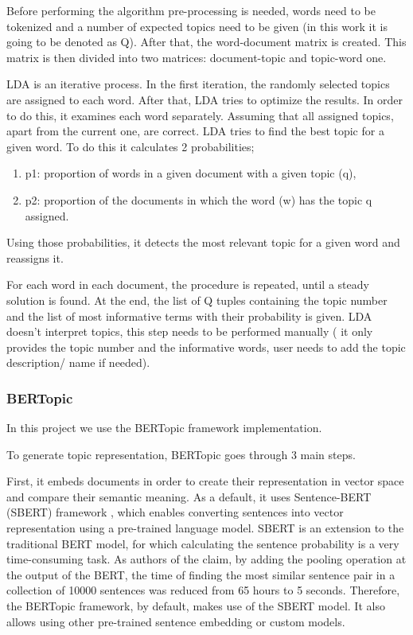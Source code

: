 \documentclass[11pt]{article}
\begin{document}
Before performing the algorithm pre-processing is needed, words need to be tokenized and a number of expected topics need to be given (in this work it is going to be denoted as Q). After that, the word-document matrix is created. This matrix is then divided into two matrices: document-topic and topic-word one. 

LDA is an iterative process. In the first iteration, the randomly selected topics are assigned to each word. After that, LDA tries to optimize the results. In order to do this, it examines each word separately. Assuming that all assigned topics, apart from the current one, are correct. LDA tries to find the best topic for a given word. To do this it calculates 2 probabilities;
\begin{enumerate}
\item p1: proportion of words in a given document with a given topic (q),
\item p2: proportion of the documents in which the word (w) has the topic q assigned.
\end{enumerate}
Using those probabilities, it detects the most relevant topic for a given word and reassigns it.

For each word in each document, the procedure is repeated, until a steady solution is found. At the  end, the list of Q tuples containing the topic number and the list of most informative terms with their probability is given. LDA doesn't interpret topics, this step needs to be performed manually ( it only provides the topic number and the informative words, user needs to add the topic description/ name if needed). 

\subsubsection{BERTopic}
In this project we use the \cite{pypi_bertopic} BERTopic framework implementation.

To generate topic representation, BERTopic goes through 3 main steps. 

First, it embeds documents in order to create their representation in vector space and compare their semantic meaning. As a default, it uses Sentence-BERT (SBERT) framework \cite{reimers-2019-sentence-bert}, which enables converting sentences into vector representation using a pre-trained language model.
SBERT is an extension to the traditional BERT model, for which calculating the sentence probability is a very time-consuming task. As authors of the \cite{DBLP:journals/corr/abs-1908-10084} claim, by adding the pooling operation at the output of the BERT, the time of finding the most similar sentence pair in a collection of 10000 sentences was reduced from 65 hours to 5 seconds. Therefore, the BERTopic framework, by default, makes use of the SBERT model. It also allows using other pre-trained sentence embedding or custom models. 
\end{document}
